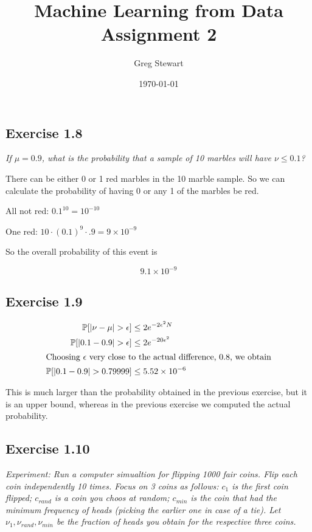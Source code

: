 \documentclass{article}
\title{Machine Learning from Data Assignment 2}
\author{Greg Stewart}
\date{\today}
\begin{document}
\maketitle

\subsection*{Exercise 1.8}

\textit{If $\mu = 0.9$, what is the probability that a sample of 10 marbles will have $\nu \leq 0.1$?}


There can be either 0 or 1 red marbles in the 10 marble sample. So we can calculate the
probability of having 0 or any 1 of the marbles be red.

All not red: $0.1^{10} = 10^{-10}$

One red: $10 \cdot (0.1)^{9} \cdot .9 = 9 \times 10^{-9}$

So the overall probability of this event is 

$$9.1 \times 10^{-9}$$


\subsection*{Exercise 1.9}

\begin{align*}
  \mathbb{P}[|\nu - \mu| > \epsilon ] &\leq 2e^{-2\epsilon^2N} \\
  \mathbb{P}[|0.1 - 0.9| > \epsilon ] &\leq 2e^{-20 \epsilon^2} \\
  \intertext{Choosing $\epsilon$ very close to the actual difference, 0.8, we obtain}
  \mathbb{P}[|0.1 - 0.9| > 0.79999 ] &\leq 5.52 \times 10^{-6}
\end{align*}

This is much larger than the probability obtained in the previous exercise, but it is an upper bound, whereas in the previous exercise we computed the actual probability.

\subsection*{Exercise 1.10}

\textit{Experiment: Run a computer simualtion for flipping 1000 fair coins. Flip each coin independently 10 times. Focus on 3 coins as follows: $c_1$ is the first coin flipped; $c_{rand}$ is a coin you choos at random; $c_{min}$ is the coin that had the minimum frequency of heads (picking the earlier one in case of a tie). Let $\nu_1, \nu_{rand}, \nu_{min}$ be the fraction of heads you obtain for the respective three coins.}
\end{document}
